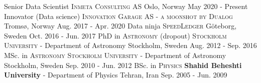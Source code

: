 \begin{cventries}
  \cventry
    {\normalsize Senior Data Scientist}
    {\textsc{Inmeta Consulting AS}}
    {\normalsize Oslo, Norway}
    {\normalsize May 2020 - Present}
    {}
  \cventry
    {\normalsize Innovator (Data science)}
    {\textsc{Innovation Garage AS - a moonshot by Dualog}}
    {\normalsize Tromsø, Norway}
    {\normalsize Aug. 2017 - Apr. 2020}
    {}
  \cventry
    {\normalsize Data ninja}
    {\textsc{SpeedLedger}}
    {\normalsize Göteborg, Sweden}
    {\normalsize Oct. 2016 - Jun. 2017}
    {}
  \cventry
    {\normalsize PhD in \textsc{Astronomy} (dropout)}
    {\textsc{Stockholm University} - Department of Astronomy}
    {\normalsize Stockholm, Sweden}
    {\normalsize Aug. 2012 - Sep. 2016}
    {}
  \cventry
    {\normalsize MSc. in \textsc{Astronomy}}
    {\textsc{Stockholm University} - Department of Astronomy}
    {\normalsize Stockholm, Sweden}
    {\normalsize Sep. 2010 - Jun. 2012}
    {}
  \cventry
    {\normalsize BSc. in \textsc{Physics}}
    {\textbf{Shahid Beheshti University} - Department of Physics}
    {\normalsize Tehran, Iran}
    {\normalsize Sep. 2005 - Jun. 2009}
    {}
\end{cventries}
